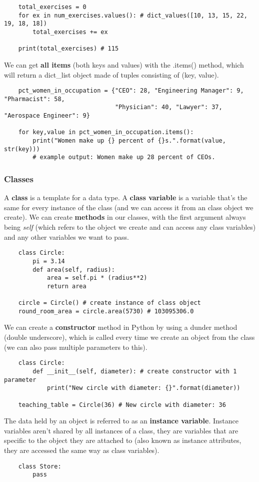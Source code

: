 \documentclass[11pt, a4paper]{article}
\begin{document}
\begin{spacing}{1.1}
\begin{lstlisting}
	total_exercises = 0
	for ex in num_exercises.values(): # dict_values([10, 13, 15, 22, 19, 18, 18])
		total_exercises += ex
	
	print(total_exercises) # 115 \end{lstlisting}\vspace*{1mm}
	We can get \textbf{all items} (both keys and values) with the .items() method, which will return a dict\_list object made of tuples consisting of (key, value). 
	\begin{lstlisting}
	pct_women_in_occupation = {"CEO": 28, "Engineering Manager": 9, "Pharmacist": 58, 
	                           "Physician": 40, "Lawyer": 37, "Aerospace Engineer": 9}
	
	for key,value in pct_women_in_occupation.items():
		print("Women make up {} percent of {}s.".format(value, str(key)))
		# example output: Women make up 28 percent of CEOs. \end{lstlisting} \vspace*{4mm}
	
	\subsubsection{Classes}
	A \textbf{class} is a template for a data type. A \textbf{class variable} is a variable that’s the same for every instance of the class (and we can access it from an class object we create). We can create \textbf{methods} in our classes, with the first argument always being \textit{self} (which refers to the object we create and can access any class variables) and any other variables we want to pass.
	\begin{lstlisting}
	class Circle:
		pi = 3.14
		def area(self, radius):
			area = self.pi * (radius**2)
			return area
	
	circle = Circle() # create instance of class object
	round_room_area = circle.area(5730) # 103095306.0 \end{lstlisting}\vspace*{1mm}
	We can create a \textbf{constructor} method in Python by using a dunder method (double underscore), which is called every time we create an object from the class (we can also pass multiple parameters to this). 
	\begin{lstlisting}
	class Circle:
		def __init__(self, diameter): # create constructor with 1 parameter
			print("New circle with diameter: {}".format(diameter))
	
	teaching_table = Circle(36) # New circle with diameter: 36	\end{lstlisting}\vspace*{1mm}
	The data held by an object is referred to as an \textbf{instance variable}. Instance variables aren't shared by all instances of a class, they are variables that are specific to the object they are attached to (also known as instance attributes, they are accessed the same way as class variables).
	\begin{lstlisting}
	class Store:
		pass
	

\end{lstlisting}
\end{spacing}
\end{document}
